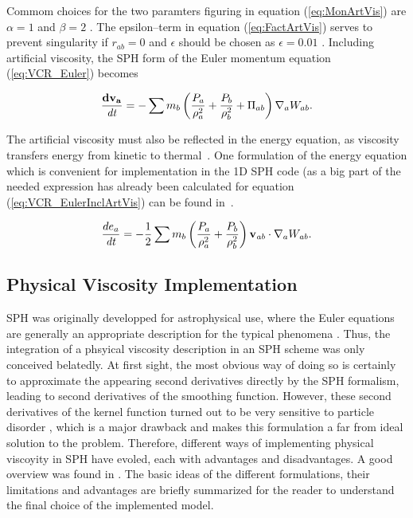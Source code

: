 \documentclass{report}
\begin{document}
Commom choices for the two paramters figuring in equation (\ref{eq:MonArtVis}) are $\alpha=1$ and $\beta=2$ \cite{Monaghan1992}. The epsilon--term in equation (\ref{eq:FactArtVis}) serves to prevent singularity if $r_{ab}=0$ and $\epsilon$ should be chosen as $\epsilon=0.01$ \cite{Monaghan1992}.
Including artificial viscosity, the SPH form of the Euler momentum equation (\ref{eq:VCR_Euler}) becomes~\cite{Monaghan2005}

\begin{equation}
\label{eq:VCR_EulerInclArtVis}
\frac{{\bf dv_{a}}}{\mathit{dt}}=-\sum {m_{b}\left(\frac{P_{a}}{\rho_{a}^{2}}+\frac{P_{b}}{\rho _{b}^{2}}+\Pi _{ab}\right)\nabla_{a}W_{ab}}.
\end{equation}

The artificial viscosity must also be reflected in the energy equation, as viscosity 
transfers energy from kinetic to thermal~\cite{Monaghan2005}. One formulation of the 
energy equation which is convenient for implementation in the 1D SPH code (as a big 
part of the needed expression has already been calculated for equation
(\ref{eq:VCR_EulerInclArtVis}) can be found in~\cite{Liu2003}.

\begin{equation}
\label{eq:ECR_EulerInclArtVis}
\frac{de_{a}}{\mathit{dt}}=-\mathit{}\frac{1}{2}\sum{m_{b}\left(\frac{P_{a}}{\rho _{a}^{2}}+\frac{P_{b}}{\rho _{b}^{2}}\right){\bf v_{\mathit{ab}}}\cdot\nabla _{a}W_{\mathit{ab}}}.
\end{equation}

\subsection{Physical Viscosity Implementation}
\label{sec:PhysViscDescr}

SPH was originally developped for astrophysical use, where the Euler equations are generally an appropriate description for the typical phenomena \cite{Liu2003}. Thus, the integration of a phsyical viscosity description in an SPH scheme was only conceived belatedly. 
At first sight, the most obvious way of doing so is certainly to approximate the appearing second derivatives directly by the SPH formalism, leading to second derivatives of the smoothing function. However, these second derivatives of the kernel function turned out to be very sensitive to particle disorder \cite{Brookshaw1986,Monaghan1988}, which is a major drawback and makes this formulation a far from ideal solution to the problem. Therefore, different ways of implementing physical viscoyity in SPH have evoled, each with advantages and disadvantages. A good overview was found in \cite{Basa2009}. The basic ideas of the different formulations, their limitations and advantages are briefly summarized for the reader to understand the final choice of the implemented model.
\end{document}
